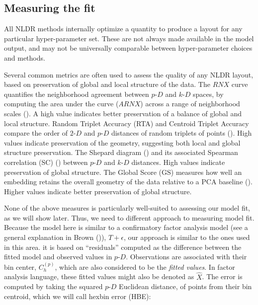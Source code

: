 \documentclass[
  11pt,
  a4paper,
]{report}
\newcommand\pD{$p\text{-}D$}
\newcommand\kD{$k\text{-}D$}
\newcommand\gD{$2\text{-}D$}
\begin{document}
\subsection{Measuring the fit}\label{sec-summary}

All NLDR methods internally optimize a quantity to produce a layout for
any particular hyper-parameter set. These are not always made available
in the model output, and may not be universally comparable between
hyper-parameter choices and methods.

Several common metrics are often used to assess the quality of any NLDR
layout, based on preservation of global and local structure of the data.
The \(RNX\) curve quantifies the neighborhood agreement between \pD{}
and \kD{} spaces, by computing the area under the curve (\(ARNX\))
across a range of neighborhood scales (). A high value indicates better preservation of a balance of
global and local structure. Random Triplet Accuracy (RTA) and Centroid
Triplet Accuracy compare the order of \gD{} and \pD{} distances of
random triplets of points (). High values indicate preservation of the geometry, suggesting
both local and global structure preservation. The Shepard diagram
() and its associated Spearman
correlation (SC) () between
\pD{} and \kD{} distances. High values indicate preservation of global
structure. The Global Score (GS) measures how well an embedding retains
the overall geometry of the data relative to a PCA baseline
(). Higher values indicate
better preservation of global structure.

None of the above measures is particularly well-suited to assessing our
model fit, as we will show later. Thus, we need to different approach to
measuring model fit. Because the model here is similar to a confirmatory
factor analysis model (see a general explanation in Brown
()), \(\widehat{T} + \epsilon\), our
approach is similar to the ones used in this area. it is based on
``residuals'' computed as the difference between the fitted model and
observed values in \pD{}. Observations are associated with their bin
center, \(C_{h}^{(p)}\), which are also considered to be the
\emph{fitted values}. In factor analysis language, these fitted values
might also be denoted as \(\widehat{X}\). The error is computed by
taking the squared \pD{} Euclidean distance, of points from their bin
centroid, which we will call hexbin error (HBE):
\end{document}
